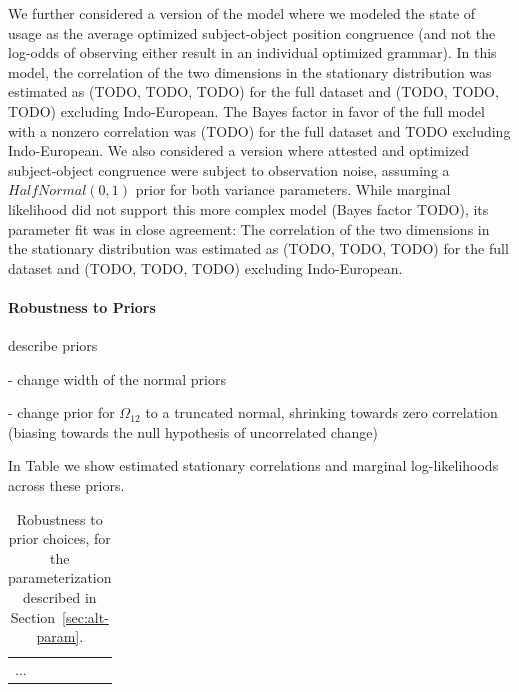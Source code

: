 \documentclass[11pt,a4paper]{article}
\begin{document}
We further considered a version of the model where we modeled the state of usage as the average optimized subject-object position congruence (and not the log-odds of observing either result in an individual optimized grammar).
In this model, the correlation of the two dimensions in the stationary distribution was estimated as (TODO, TODO, TODO) for the full dataset and (TODO, TODO, TODO) excluding Indo-European.
The Bayes factor in favor of the full model with a nonzero correlation was (TODO) for the full dataset and TODO excluding Indo-European.
We also considered a version where attested and optimized subject-object congruence were subject to observation noise, assuming a $HalfNormal(0,1)$ prior for both variance parameters.
While marginal likelihood did not support this more complex model (Bayes factor TODO), its parameter fit was in close agreement: The correlation of the two dimensions in the stationary distribution was estimated as (TODO, TODO, TODO) for the full dataset and (TODO, TODO, TODO) excluding Indo-European.


\paragraph{Robustness to Priors}
describe priors

- change width of the normal priors

- change prior for $\Omega_{12}$ to a truncated normal, shrinking towards zero correlation (biasing towards the null hypothesis of uncorrelated change)

In Table we show estimated stationary correlations and marginal log-likelihoods across these priors.

\begin{table}
\begin{tabular}{llllll}
	...
\end{tabular}
	\caption{Robustness to prior choices, for the parameterization described in Section~\ref{sec:alt-param}.}
\end{table}
\end{document}
